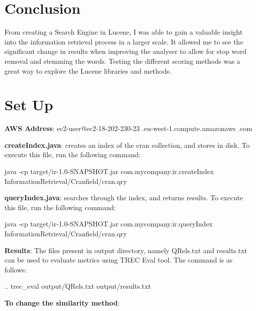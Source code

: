 \section{Conclusion}
From creating a Search Engine in Lucene, I was able to gain a valuable insight into the information retrieval process in a larger scale. It allowed me to see the significant change in results when improving the analyser to allow for stop word removal and stemming  the words. Testing the different scoring methods was a great way to explore the Lucene libraries and methods.\par 

\section{Set Up}

\textbf{AWS Address}: \newline ec2-user@ec2-18-202-230-23
.eu-west-1.compute.amazonaws \newline .com \newline


\noindent \textbf{createIndex.java}: creates an index of the cran collection, and stores in disk. To execute this file, run the following command:

\begin{center} 
 java -cp target/ir-1.0-SNAPSHOT.jar com.mycompany.ir.createIndex InformationRetrieval/Cranfield/cran.qry \newline
\end{center}

\noindent \textbf{queryIndex.java}: searches through the index, and returns results. To execute this file, run the following command:

\begin{center} 
 java -cp target/ir-1.0-SNAPSHOT.jar com.mycompany.ir.queryIndex InformationRetrieval/Cranfield/cran.qry \newline
\end{center}

\noindent \textbf{Results}: The files present in output directory, namely QRels.txt and results.txt can be used to evaluate metrics using TREC Eval tool. The command is as follows:

\begin{center} 
.. trec\_eval output/QRels.txt output/results.txt \newline
\end{center}

\noindent \textbf{To change the similarity method}: 

